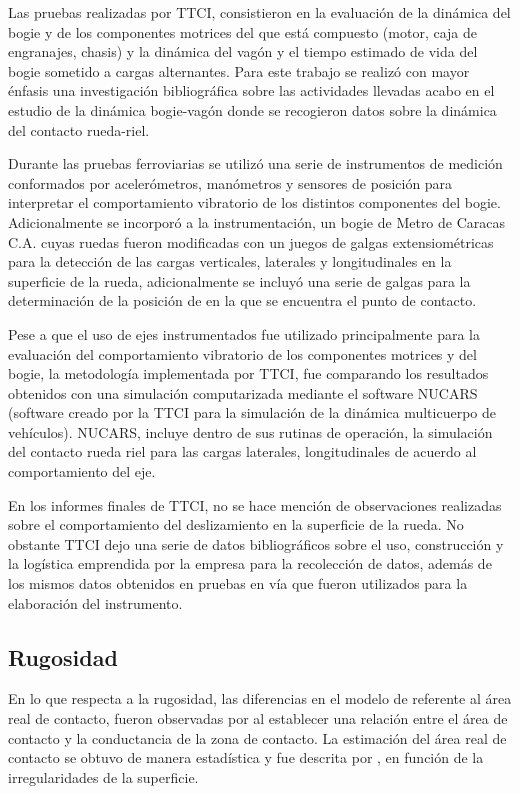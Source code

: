\documentclass[main]{subfiles}
\begin{document}
	Las pruebas realizadas por TTCI, consistieron en la evaluación de la dinámica del bogie y de los componentes motrices del que está compuesto (motor, caja de engranajes, chasis) y la dinámica del vagón y el tiempo estimado de vida del bogie sometido a cargas alternantes. Para este trabajo se realizó con mayor énfasis una investigación bibliográfica sobre las actividades llevadas acabo en el estudio de la dinámica bogie-vagón donde se recogieron datos sobre la dinámica del contacto rueda-riel.
	
	Durante las pruebas ferroviarias se utilizó una serie de instrumentos de medición conformados por acelerómetros, manómetros y sensores de posición para interpretar el comportamiento vibratorio de los distintos componentes del bogie. Adicionalmente se incorporó a la instrumentación, un bogie de Metro de Caracas C.A. cuyas ruedas fueron modificadas con un juegos de galgas extensiométricas para la detección de las cargas verticales, laterales y longitudinales en la superficie de la rueda, adicionalmente se incluyó una serie de galgas para la determinación de la posición de en la que se encuentra el punto de contacto.
	
	Pese a que el uso de ejes instrumentados fue utilizado principalmente para la evaluación del comportamiento vibratorio de los componentes motrices y del bogie, la metodología implementada por TTCI, fue comparando los resultados obtenidos con una simulación computarizada mediante el software NUCARS (software creado por la TTCI para la simulación de la dinámica multicuerpo de vehículos). NUCARS, incluye dentro de sus rutinas de operación, la simulación del contacto rueda riel para las cargas laterales, longitudinales de acuerdo al comportamiento del eje.
	
	En los informes finales de TTCI, no se hace mención de observaciones realizadas sobre el comportamiento del deslizamiento en la superficie de la rueda. No obstante TTCI dejo una serie de datos bibliográficos sobre el uso, construcción y la logística emprendida por la empresa para la recolección de datos, además de los mismos datos obtenidos en pruebas en vía que fueron utilizados para la elaboración del instrumento.

\subsection{Rugosidad} 

  En lo que respecta a la rugosidad, las diferencias en el modelo de \citet{Herz1881} referente al área real de contacto, fueron observadas por \citet{Bowden07021939} al establecer una relación entre el área de contacto y la conductancia de la zona de contacto. La estimación del área real de contacto se obtuvo de manera estadística y fue descrita por \citet{Greenwood06121966}, en función de la irregularidades de la superficie.
  
\end{document}
